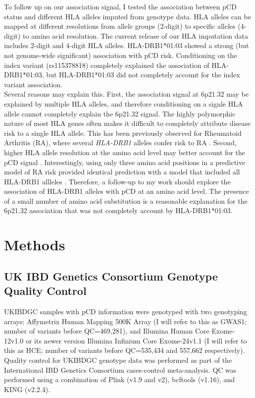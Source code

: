 To follow up on our association signal, I tested the association between pCD status and different HLA alleles imputed from genotype data. HLA alleles can be mapped at different resolutions from allele groups (2-digit) to specific alleles (4-digit) to amino acid resolution. The current release of our HLA imputation data includes 2-digit and 4-digit HLA alleles. HLA-DRB1*01:03 showed a strong (but not genome-wide significant) association with pCD risk. Conditioning on the index variant (rs115378818) completely explained the association of HLA-DRB1*01:03, but HLA-DRB1*01:03 did not completely account for the index variant association. \\

Several reasons may explain this. First, the association signal at 6p21.32 may be explained by multiple HLA alleles, and therefore conditioning on a signle HLA allele cannot completely explain the 6p21.32 signal. The highly polymorphic nature of most HLA genes often makes it difficult to completely attribute disease risk to a single HLA allele. This has been previously observed for Rheumatoid Arthritis (RA), where several \textit{HLA-DRB1} alleles confer risk to RA \cite{Van_Drongelen2017-dh}. Second, higher HLA allele resolution at the amino acid level may better account for the pCD signal \cite{Molineros2019-mu}. Interestingly, using only three amino acid positions in a predictive model of RA risk provided identical prediction with a model that included all HLA-DRB1 allleles \cite{Raychaudhuri2012-em}. Therefore, a follow-up to my work should explore the association of HLA-DRB1 alleles with pCD at an amino acid level. The presence of a small number of amino acid substitution is a reasonable explanation for the 6p21.32 association that was not completely account by HLA-DRB1*01:03.\\




\section{Methods}
\subsection{UK IBD Genetics Consortium Genotype Quality Control}
UKIBDGC samples with pCD information were genotyped with two genotyping arrays: Affymetrix Human Mapping 500K Array (I will refer to this as GWAS1; number of variants before QC=469,281), and Illumina Human Core Exome-12v1.0 or its newer version Illumina Infinium Core Exome-24v1.1 (I will refer to this as HCE; number of variants before QC=535,434 and 557,662 respectively). Quality control for UKIBDGC genotype data was performed as part of the International IBD Genetics Consortium cases-control meta-analysis. QC was performed using a combination of Plink (v1.9 and v2), bcftools (v1.16), and KING (v2.2.4).
